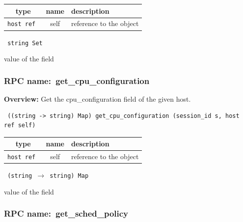 
 
\vspace{0.3cm}
\begin{tabular}{|c|c|p{7cm}|}
 \hline
{\bf type} & {\bf name} & {\bf description} \\ \hline
{\tt host ref } & self & reference to the object \\ \hline 

\end{tabular}

\vspace{0.3cm}

{\tt 
string Set
}


value of the field
\vspace{0.3cm}
\vspace{0.3cm}
\vspace{0.3cm}
\subsubsection{RPC name:~get\_cpu\_configuration}

{\bf Overview:} 
Get the cpu\_configuration field of the given host.

\begin{verbatim} ((string -> string) Map) get_cpu_configuration (session_id s, host ref self)\end{verbatim}



 
\vspace{0.3cm}
\begin{tabular}{|c|c|p{7cm}|}
 \hline
{\bf type} & {\bf name} & {\bf description} \\ \hline
{\tt host ref } & self & reference to the object \\ \hline 

\end{tabular}

\vspace{0.3cm}

{\tt 
(string $\rightarrow$ string) Map
}


value of the field
\vspace{0.3cm}
\vspace{0.3cm}
\vspace{0.3cm}
\subsubsection{RPC name:~get\_sched\_policy}

